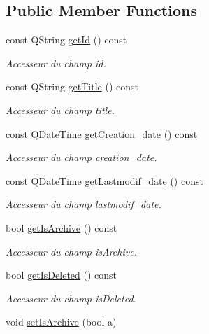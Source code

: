 \subsection*{Public Member Functions}
\begin{DoxyCompactItemize}
\item 
const Q\+String \hyperlink{class_note_afafbebe4aa35b8d29d903bc53fa31929}{get\+Id} () const
\begin{DoxyCompactList}\small\item\em Accesseur du champ id. \end{DoxyCompactList}\item 
const Q\+String \hyperlink{class_note_afd40e5372b7fd231bbd31038bf0bb4d9}{get\+Title} () const
\begin{DoxyCompactList}\small\item\em Accesseur du champ title. \end{DoxyCompactList}\item 
const Q\+Date\+Time \hyperlink{class_note_a89b9be4eae802c78a0959aa9bd408e41}{get\+Creation\+\_\+date} () const
\begin{DoxyCompactList}\small\item\em Accesseur du champ creation\+\_\+date. \end{DoxyCompactList}\item 
const Q\+Date\+Time \hyperlink{class_note_ab1811bb7017d2e1487c90f39b946d572}{get\+Lastmodif\+\_\+date} () const
\begin{DoxyCompactList}\small\item\em Accesseur du champ lastmodif\+\_\+date. \end{DoxyCompactList}\item 
bool \hyperlink{class_note_a3ff22c94b72b8c5cb93638bd16262d0d}{get\+Is\+Archive} () const
\begin{DoxyCompactList}\small\item\em Accesseur du champ is\+Archive. \end{DoxyCompactList}\item 
bool \hyperlink{class_note_af56c546c7e0e471b2dd5b201d4835e37}{get\+Is\+Deleted} () const
\begin{DoxyCompactList}\small\item\em Accesseur du champ is\+Deleted. \end{DoxyCompactList}\item 
\mbox{\label{class_note_acef3631134d65fba4ac015463884164c}} 
void \hyperlink{class_note_acef3631134d65fba4ac015463884164c}{set\+Is\+Archive} (bool a)

\end{DoxyCompactItemize}
